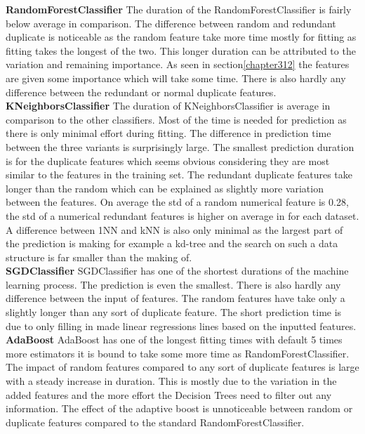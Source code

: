 \documentclass[a4paper,10pt]{article}
\begin{document}
\textbf{RandomForestClassifier} The duration of the RandomForestClassifier is fairly below average in comparison. The difference between random and redundant duplicate is noticeable as the random feature take more time mostly for fitting as fitting takes the longest of the two. This longer duration can be attributed to the variation and remaining importance. As seen in section\ref{chapter312} the features are given some importance which will take some time. There is also hardly any difference between the redundant or normal duplicate features.  \\

\textbf{KNeighborsClassifier} The duration of KNeighborsClassifier is average in comparison to the other classifiers. Most of the time is needed for prediction as there is only minimal effort during fitting. The difference in prediction time between the three variants is surprisingly large. The smallest prediction duration is for the duplicate features which seems obvious considering they are most similar to the features in the training set. The redundant duplicate features take longer than the random which can be explained as slightly more variation between the features. On average the std of a random numerical feature is 0.28, the std of a numerical redundant features is higher on average in for each dataset. A difference between 1NN and kNN is also only minimal as the largest part of the prediction is making for example a kd-tree and the search on such a data structure is far smaller than the making of.\\

\textbf{SGDClassifier} SGDClassifier has one of the shortest durations of the machine learning process. The prediction is even the smallest. There is also hardly any difference between the input of features. The random features have take only  a slightly longer than any sort of duplicate feature. The short prediction time is due to only filling in made linear regressions lines based on the inputted features. \\

\textbf{AdaBoost} AdaBoost has one of the longest fitting times with default 5 times more estimators it is bound to take some more time as RandomForestClassifier. The impact of random features compared to any sort of duplicate features is large with a steady increase in duration. This is mostly due to the variation in the added features and the more effort the Decision Trees need to filter out any information. The effect of the adaptive boost is unnoticeable between random or duplicate features compared to the standard RandomForestClassifier.  \\
\end{document}
